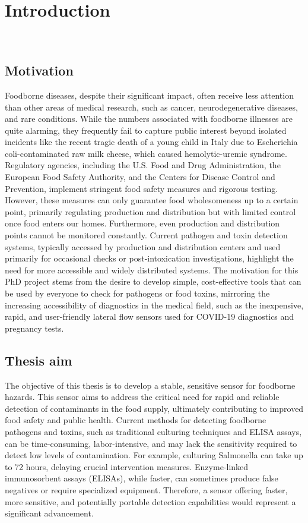 
\chapter{Introduction}
\label{cap:introduction}
\thispagestyle{empty}

\newpage
\thispagestyle{empty}
\ %
\newpage

\section{Motivation}

Foodborne diseases, despite their significant impact, often receive less attention than other areas of medical research, such as cancer, neurodegenerative diseases, and rare conditions. While the numbers associated with foodborne illnesses are quite alarming, they frequently fail to capture public interest beyond isolated incidents like the recent tragic death of a young child in Italy due to Escherichia coli-contaminated raw milk cheese, which caused hemolytic-uremic syndrome. Regulatory agencies, including the U.S. Food and Drug Administration, the European Food Safety Authority, and the Centers for Disease Control and Prevention, implement stringent food safety measures and rigorous testing. However, these measures can only guarantee food wholesomeness up to a certain point, primarily regulating production and distribution but with limited control once food enters our homes. Furthermore, even production and distribution points cannot be monitored constantly. Current pathogen and toxin detection systems, typically accessed by production and distribution centers and used primarily for occasional checks or post-intoxication investigations, highlight the need for more accessible and widely distributed systems. The motivation for this PhD project stems from the desire to develop simple, cost-effective tools that can be used by everyone to check for pathogens or food toxins, mirroring the increasing accessibility of diagnostics in the medical field, such as the inexpensive, rapid, and user-friendly lateral flow sensors used for COVID-19 diagnostics and pregnancy tests.

\section{Thesis aim}

The objective of this thesis is to develop a stable, sensitive sensor for foodborne hazards. This sensor aims to address the critical need for rapid and reliable detection of contaminants in the food supply, ultimately contributing to improved food safety and public health. Current methods for detecting foodborne pathogens and toxins, such as traditional culturing techniques and ELISA assays, can be time-consuming, labor-intensive, and may lack the sensitivity required to detect low levels of contamination. For example, culturing Salmonella can take up to 72 hours, delaying crucial intervention measures. Enzyme-linked immunosorbent assays (ELISAs), while faster, can sometimes produce false negatives or require specialized equipment. Therefore, a sensor offering faster, more sensitive, and potentially portable detection capabilities would represent a significant advancement.

